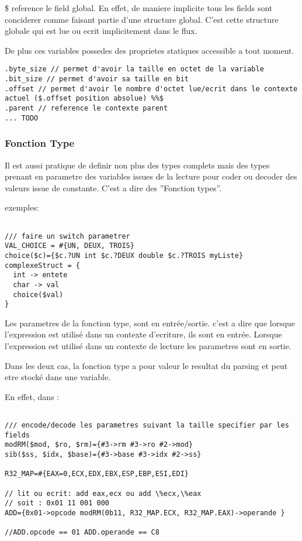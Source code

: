 \documentclass[11pt]{report}
\begin{document}
\$ reference le field global. En effet, de maniere implicite tous les fields sont conciderer comme faisant partie
d'une structure global. C'est cette structure globale qui est lue ou ecrit implicitement dans le flux.

De plus ces variables possedes des proprietes statiques accessible a tout moment.
\begin{lstlisting}
.byte_size // permet d'avoir la taille en octet de la variable
.bit_size // permet d'avoir sa taille en bit
.offset // permet d'avoir le nombre d'octet lue/ecrit dans le contexte actuel ($.offset position absolue) %%$
.parent // reference le contexte parent
... TODO
\end{lstlisting}


\subsubsection{Fonction Type}

Il est aussi pratique de definir non plus des types complets mais des types prenant en parametre des variables issues
de la lecture pour coder ou decoder des valeurs issue de constante.
C'est a dire des ''Fonction types''.

exemples:
\begin{lstlisting}

/// faire un switch parametrer
VAL_CHOICE = #{UN, DEUX, TROIS}
choice($c)={$c.?UN int $c.?DEUX double $c.?TROIS myListe} 
complexeStruct = {
  int -> entete
  char -> val
  choice($val) 
}
\end{lstlisting} %

Les parametres de la fonction type, sont en entrée/sortie. c'est a dire que lorsque l'expression est utilisé
dans un contexte d'ecriture, ils sont en entrée.
Lorsque l'expression est utilisé dans un contexte de lecture les parametres sont en sortie.

Dans les deux cas, la fonction type a pour valeur le resultat du parsing et peut etre stocké dans une variable.

En effet, dans :
\begin{lstlisting}

/// encode/decode les parametres suivant la taille specifier par les fields
modRM($mod, $ro, $rm)={#3->rm #3->ro #2->mod} 
sib($ss, $idx, $base)={#3->base #3->idx #2->ss} 

R32_MAP=#{EAX=0,ECX,EDX,EBX,ESP,EBP,ESI,EDI}

// lit ou ecrit: add eax,ecx ou add \%ecx,\%eax
// soit : 0x01 11 001 000 
ADD={0x01->opcode modRM(0b11, R32_MAP.ECX, R32_MAP.EAX)->operande }

//ADD.opcode == 01 ADD.operande == C8
\end{lstlisting} %
\end{document}
